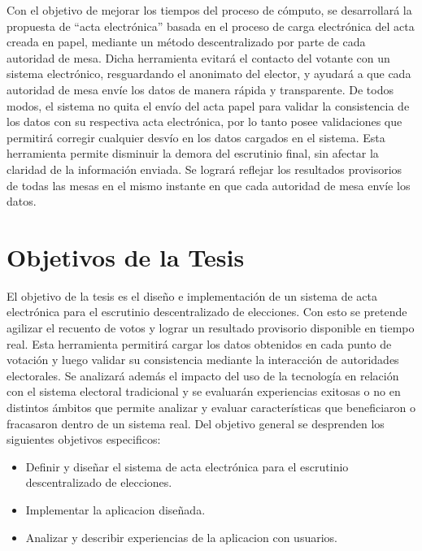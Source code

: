 Con el objetivo de mejorar los tiempos del proceso de cómputo, se desarrollará la propuesta de ``acta electrónica'' basada en el proceso de carga electrónica del acta creada en papel, mediante un método descentralizado  por parte de cada autoridad de mesa. Dicha herramienta evitará el contacto del votante con un sistema electrónico, resguardando el anonimato del elector, y ayudará a que cada autoridad de mesa envíe los datos de manera rápida y transparente. De todos modos, el sistema no quita el envío del acta papel para validar la consistencia de los datos con su respectiva acta electrónica, por lo tanto posee validaciones que permitirá corregir cualquier desvío en los datos cargados en el sistema. Esta herramienta permite disminuir la demora del escrutinio final, sin afectar la claridad de la información enviada. Se logrará reflejar los resultados provisorios de todas las mesas 
en el mismo instante en que cada autoridad de mesa envíe los datos.

\section{Objetivos de la Tesis}
El objetivo de la tesis es el diseño e implementación de un sistema de acta electrónica para el escrutinio descentralizado de elecciones. Con esto se pretende agilizar el recuento de votos y lograr un resultado provisorio disponible en tiempo real. Esta herramienta permitirá cargar los datos obtenidos en cada punto de votación y luego validar su consistencia mediante la interacción de autoridades electorales. \newline
Se analizará además el impacto del uso de la tecnología en relación con el sistema electoral tradicional y se evaluarán experiencias exitosas o no en distintos ámbitos que permite analizar y evaluar características que beneficiaron o fracasaron dentro de un sistema real.\newline
Del objetivo general se desprenden los siguientes objetivos especificos: 
\begin{itemize}
    \item Definir y diseñar el sistema de acta electrónica para el escrutinio descentralizado de elecciones.
    \item Implementar la aplicacion diseñada.
    \item Analizar y describir experiencias de la aplicacion con usuarios.
\end{itemize}

